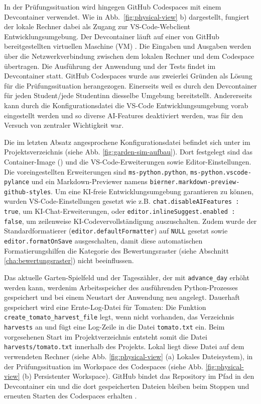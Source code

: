 In der Prüfungssituation wird hingegen GitHub Codespaces mit einem Devcontainer verwendet. Wie in Abb.~\ref{fig:physical-view} b) dargestellt, fungiert der lokale Rechner dabei als Zugang zur VS-Code-Webclient Entwicklungsumgebung. Der Devcontainer läuft auf einer von GitHub bereitgestellten virtuellen Maschine (VM) \parencite{github_codespaces_deep_dive}. Die Eingaben und Ausgaben werden über die Netzwerkverbindung zwischen dem lokalen Rechner und dem Codespace übertragen. Die Ausführung der Anwendung und der Tests findet im Devcontainer statt. GitHub Codespaces wurde aus zweierlei Gründen als Lösung für die Prüfungssituation herangezogen. Einerseits weil es durch den Devcontainer für jeden Student/jede Studentinn diesselbe Umgebung bereitstellt. Andererseits kann durch die Konfigurationsdatei die VS-Code Entwicklungsumgebung vorab eingestellt werden und so diverse AI-Features deaktiviert werden, was für den Versuch von zentraler Wichtigkeit war.

Die im letzten Absatz angesprochene Konfigurationsdatei befindet sich unter  im Projektsverzeichnis (siehe Abb. \ref{fig:garden-sim-aufbau}). Dort festgelegt sind das Container-Image () und die VS-Code-Erweiterungen sowie Editor-Einstellungen. Die voreingestellten Erweiterungen sind \texttt{ms-python.python}, \texttt{ms-python.vscode-pylance} und ein Markdown-Previewer namens \texttt{bierner.markdown-preview-github-styles}. Um eine KI-freie Entwicklungsumgebung garantieren zu können, wurden VS-Code-Einstellungen gesetzt wie z.B. \texttt{chat.disableAIFeatures : true}, um KI-Chat-Erweiterungen, oder \texttt{editor.inlineSuggest.enabled : false}, um zeilenweise KI-Codevervollständigung auszuschalten. Zudem wurde der Standardformatierer (\texttt{editor.defaultFormatter}) auf \texttt{NULL} gesetzt sowie \texttt{editor.formatOnSave} ausgeschalten, damit diese automatischen Formatierungshilfen die Kategorie  des Bewertungsraster (siehe Abschnitt \ref{cha:bewertungsraster}) nicht beeinflussen. 

Das aktuelle Garten-Spielfeld und der Tageszähler, der mit \texttt{advance\_day} erhöht werden kann, werdenim Arbeitsspeicher des ausführenden Python-Prozesses gespeichert und bei einem Neustart der Anwendung neu angelegt. Dauerhaft gespeichert wird eine Ernte-Log-Datei für Tomaten: Die Funktion \texttt{create\_tomato\_\allowbreak harvest\_file} legt, wenn nicht vorhanden, das Verzeichnis \texttt{harvests} an und fügt eine Log-Zeile in die Datei \texttt{tomato.txt} ein. Beim vorgesehenen Start im Projektverzeichnis entsteht somit die Datei \texttt{harvests/tomato.txt} innerhalb des Projekts. Lokal liegt diese Datei auf dem verwendeten Rechner (siehe Abb. \ref{fig:physical-view} (a) Lokales Dateisystem), in der Prüfungssituation im Workspace des Codespaces (siehe Abb. \ref{fig:physical-view} (b) Persistenter Workspace). GitHub bindet das Repository im Pfad  in den Devcontainer ein und die dort gespeicherten Dateien bleiben beim Stoppen und erneuten Starten des Codespaces erhalten \parencite{github_codespaces_deep_dive}.

